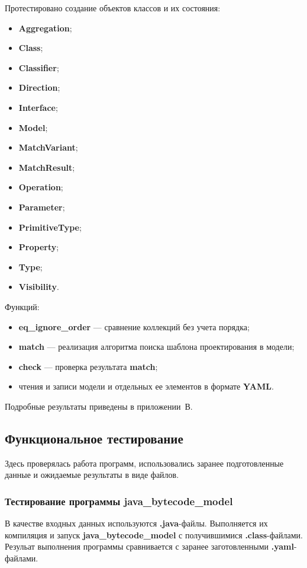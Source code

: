 Протестировано создание объектов классов и их состояния:
\begin{itemize}
\item \textbf{Aggregation};
\item \textbf{Class};
\item \textbf{Classifier};
\item \textbf{Direction};
\item \textbf{Interface};
\item \textbf{Model};
\item \textbf{MatchVariant};
\item \textbf{MatchResult};
\item \textbf{Operation};
\item \textbf{Parameter};
\item \textbf{PrimitiveType};
\item \textbf{Property};
\item \textbf{Type};
\item \textbf{Visibility}.
\end{itemize}

Функций:
\begin{itemize}
\item \textbf{eq\_ignore\_order} --- сравнение коллекций без учета порядка;
\item \textbf{match} --- реализация алгоритма поиска шаблона проектирования в модели;
\item \textbf{check} --- проверка результата \textbf{match};
\item чтения и записи модели и отдельных ее элементов в формате \textbf{YAML}.
\end{itemize}

Подробные результаты приведены в приложении~В.

\subsection{Функциональное тестирование}

Здесь проверялась работа программ, использовались заранее подготовленные данные
и ожидаемые результаты в виде файлов.

\subsubsection{Тестирование программы java\_bytecode\_model}

В качестве входных данных используются \textbf{.java}-файлы.
Выполняется их компиляция и запуск \textbf{java\_bytecode\_model} с
получившимися \textbf{.class}-файлами.
Резульат выполнения программы сравнивается с заранее заготовленными
\textbf{.yaml}-файлами.

